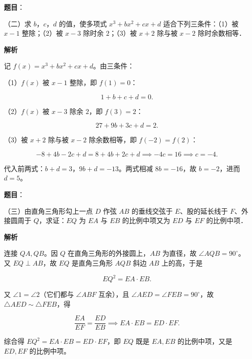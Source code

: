 \begin{answer}

\textbf{题目}：

（二）求 $b$，$c$，$d$ 的值，使多项式 $x^3+bx^2+cx+d$ 适合下列三条件：（1）被 $x-1$ 整除；（2）被 $x-3$ 除时余 $2$；（3）被 $x+2$ 除与被 $x-2$ 除时余数相等．

\textbf{解析}

记 $f(x)=x^3+bx^2+cx+d$。由三条件：

（1）$f(x)$ 被 $x-1$ 整除，即 $f(1)=0$：

\nopagebreak[4]
\[
1+b+c+d=0.
\]

（2）$f(x)$ 被 $x-3$ 除余 $2$，即 $f(3)=2$：

\nopagebreak[4]
\[
27+9b+3c+d=2.
\]

（3）被 $x+2$ 除与被 $x-2$ 除余数相等，即 $f(-2)=f(2)$：

\nopagebreak[4]
\[
-8+4b-2c+d=8+4b+2c+d
\implies -4c=16\implies c=-4.
\]

代入前两式：$b+d=3$，$9b+d=-13$。两式相减 $8b=-16$，故 $b=-2$，进而 $d=5$。


\end{answer}
\begin{answer}

\textbf{题目}：

（三）由直角三角形勾上一点 $D$ 作弦 $AB$ 的垂线交弦于 $E$、股的延长线于 $F$、外接圆周于 $Q$，求证：$EQ$ 为 $EA$ 与 $EB$ 的比例中项又为 $ED$ 与 $EF$ 的比例中项．

\textbf{解析}

连接 $QA,QB$。因 $Q$ 在直角三角形的外接圆上，$AB$ 为直径，故 $\angle AQB=90^\circ$。又 $EQ\perp AB$，故 $EQ$ 是直角三角形 $AQB$ 斜边 $AB$ 上的高，于是

\nopagebreak[4]
\[
EQ^2=EA\cdot EB.
\]

又 $\angle 1=\angle 2$（它们都与 $\angle ABF$ 互余），且 $\angle AED=\angle FEB=90^\circ$，故 $\triangle AED\sim\triangle FEB$，得

\nopagebreak[4]
\[
\frac{EA}{EF}=\frac{ED}{EB}
\implies EA\cdot EB=ED\cdot EF.
\]

综合得 $EQ^2=EA\cdot EB=ED\cdot EF$，即 $EQ$ 既是 $EA,EB$ 的比例中项，又是 $ED,EF$ 的比例中项。


\end{answer}
